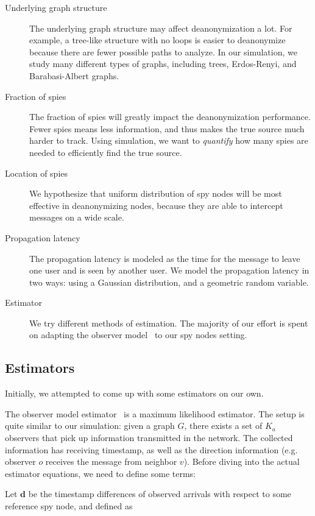 \begin{description}
\item[Underlying graph structure] The underlying graph structure may affect deanonymization a lot. For example, a tree-like structure with no loops is easier to deanonymize because there are fewer possible paths to analyze. In our simulation, we study many different types of graphs, including trees, Erdos-Renyi, and Barabasi-Albert graphs.
\item[Fraction of spies] The fraction of spies will greatly impact the deanonymization performance. Fewer spies means less information, and thus makes the true source much harder to track. Using simulation, we want to \emph{quantify} how many spies are needed to efficiently find the true source.
\item[Location of spies] We hypothesize that uniform distribution of spy nodes will be most effective in deanonymizing nodes, because they are able to intercept messages on a wide scale. 
\item[Propagation latency] The propagation latency is modeled as the time for the message to leave one user and is seen by another user. 
We model the propagation latency in two ways: using a Gaussian distribution, and a geometric random variable. 
\item[Estimator] We try different methods of estimation. The majority of our effort is spent on adapting the observer model~\cite{pinto} to our spy nodes setting.
\end{description}

\subsection{Estimators}
Initially, we attempted to come up with some estimators on our own. 

The observer model estimator~\cite{pinto} is a maximum likelihood estimator. The setup is quite similar to our simulation: given a graph $G$, there exists a set of $K_a$ observers that pick up information transmitted in the network. The collected information has receiving timestamp, as well as the direction information (e.g. observer $o$ receives the message from neighbor $v$). Before diving into the actual estimator equations, we need to define some terms:

Let $\boldsymbol{d}$ be the timestamp differences of observed arrivals with respect to some reference spy node, and defined as

